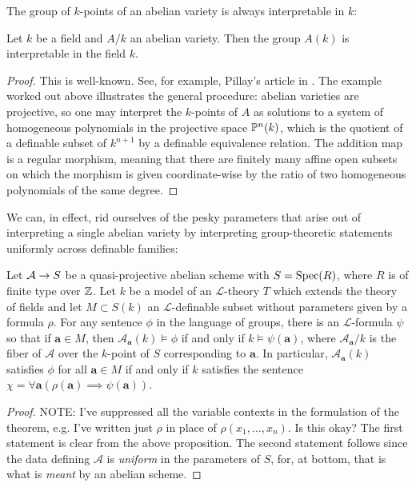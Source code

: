 The group of $k$-points of an abelian variety is always interpretable in $k$:

\begin{proposition}
Let $k$ be a field and $A/k$ an abelian variety. Then the group $A(k)$ is interpretable in the field $k$.
\end{proposition}
\begin{proof}
This is well-known. See, for example, Pillay's article in \cite{bouscaren2009model}. The example worked out above illustrates the general procedure: abelian varieties are projective, so one may interpret the $k$-points of $A$ as solutions to a system of homogeneous polynomials in the projective space $\mathbb{P}^n(k)$, which is the quotient of a definable subset of $k^{n+1}$ by a definable equivalence relation. The addition map is a regular morphism, meaning that there are finitely many affine open subsets on which the morphism is given coordinate-wise by the ratio of two homogeneous polynomials of the same degree.
\end{proof}

We can, in effect, rid ourselves of the pesky parameters that arise out of interpreting a single abelian variety by interpreting group-theoretic statements uniformly across definable families:

\begin{theorem}
Let $\mathcal{A}\rightarrow S$ be a quasi-projective abelian scheme with $S=\operatorname{Spec}(R)$, where $R$ is of finite type over $\mathbb{Z}$. Let $k$ be a model of an $\mathcal{L}$-theory $T$ which extends the theory of fields and let $M\subset S(k)$ an $\mathcal{L}$-definable subset without parameters given by a formula $\rho$. For any sentence $\phi$ in the language of groups, there is an $\mathcal{L}$-formula $\psi$ so that if $\mathbf{a}\in M$, then $\mathcal{A}_{\mathbf{a}}(k)\models\phi$ if and only if $k\models\psi(\mathbf{a})$, where $\mathcal{A}_{\mathbf{a}}/k$ is the fiber of $\mathcal{A}$ over the $k$-point of $S$ corresponding to $\mathbf{a}$. In particular, $\mathcal{A}_{\mathbf{a}}(k)$ satisfies $\phi$ for all $\mathbf{a}\in M$ if and only if $k$ satisfies the sentence $\chi = \forall \mathbf{a}(\rho(\mathbf{a})\implies \psi(\mathbf{a}))$.
\end{theorem}
\begin{proof}
NOTE: I've suppressed all the variable contexts in the formulation of the theorem, e.g. I've written just $\rho$ in place of $\rho(x_1,\dots, x_n)$. Is this okay?
The first statement is clear from the above proposition. The second statement follows since the data defining $\mathcal{A}$ is \emph{uniform} in the parameters of $S$, for, at bottom, that is what is \emph{meant} by an abelian scheme.
\end{proof}

